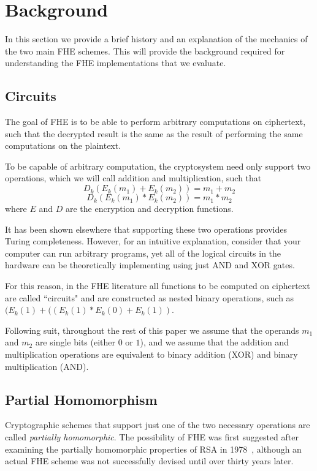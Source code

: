 \documentclass[letterpaper,twocolumn,10pt]{article}
\begin{document}
\section{Background}
In this section we provide a brief history and an explanation of the mechanics of the two main FHE schemes. This will provide the background required for understanding the FHE implementations that we evaluate.

\subsection{Circuits}
The goal of FHE is to be able to perform arbitrary computations on ciphertext, such that the decrypted result is the same as the result of performing the same computations on the plaintext.

To be capable of arbitrary computation, the cryptosystem need only support two operations, which we will call addition and multiplication, such that
$$D_k(E_k(m_1) + E_k(m_2)) = m_1 + m_2$$
$$D_k(E_k(m_1) * E_k(m_2)) = m_1 * m_2$$
where $E$ and $D$ are the encryption and decryption functions.

It has been shown elsewhere that supporting these two operations provides Turing completeness. However, for an intuitive explanation, consider that your computer can run arbitrary programs, yet all of the logical circuits in the hardware can be theoretically implementing using just AND and XOR gates. 

For this reason, in the FHE literature all functions to be computed on ciphertext are called ``circuits" and are constructed as nested binary operations, such as $(E_k(1)+((E_k(1)*E_k(0)+E_k(1))$.

Following suit, throughout the rest of this paper we assume that the operands $m_1$ and $m_2$ are single bits (either $0$ or $1$), and we assume that the addition and multiplication operations are equivalent to binary addition (XOR) and binary multiplication (AND).

\subsection{Partial Homomorphism}
Cryptographic schemes that support just one of the two necessary operations are called \emph{partially homomorphic}. The possibility of FHE was first suggested after examining the partially homomorphic properties of RSA in 1978~\cite{Rivest}, although an actual FHE scheme was not successfully devised until over thirty years later.
\end{document}
